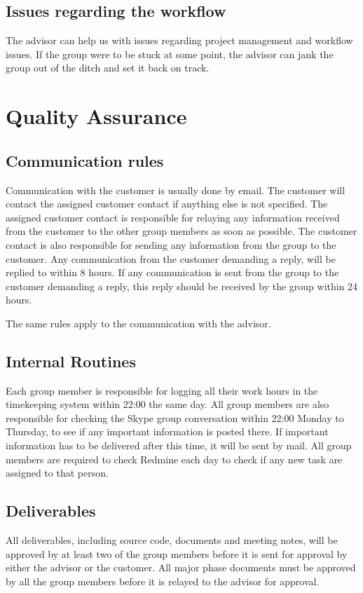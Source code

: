 \subsection{Issues regarding the workflow}
The advisor can help us with issues regarding project management and workflow issues. If the group were to be stuck at some point, the advisor can jank the group out of the ditch and set it back on track. 

\section{Quality Assurance}
\subsection{Communication rules}
Communication with the customer is usually done by email. The customer will contact the assigned customer contact if anything else is not specified. The assigned customer contact is responsible for relaying any information received from the customer to the other group members as soon as possible. The customer contact is also responsible for sending any information from the group to the customer. Any communication from the customer demanding a reply, will be replied to within 8 hours. If any communication is sent from the group to the customer demanding a reply, this reply should be received by the group within 24 hours.

The same rules apply to the communication with the advisor.

\subsection{Internal Routines}
Each group member is responsible for logging all their work hours in the timekeeping system within 22:00 the same day. All group members are also responsible for checking the Skype group conversation within 22:00 Monday to Thursday, to see if any important information is posted there. If important information has to be delivered after this time, it will be sent by mail. All group members are required to check Redmine each day to check if any new task are assigned to that person.

\subsection{Deliverables}
All deliverables, including source code, documents and meeting notes, will be approved by at least two of the group members before it is sent for approval by either the advisor or the customer. All major phase documents must be approved by all the group members before it is relayed to the advisor for approval.


